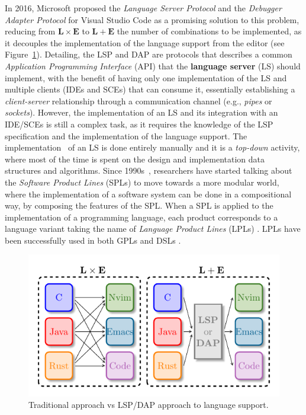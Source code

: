 In 2016, Microsoft proposed the \textit{Language Server Protocol} and the \textit{Debugger Adapter Protocol} for Visual Studio Code as a promising solution to this problem, reducing from $\mathbf{L} \times \mathbf{E}$ to $\mathbf{L} + \mathbf{E}$ the number of combinations to be implemented, as it decouples the implementation of the language support from the editor (see Figure~\ref{fig:traditional}).
Detailing, the LSP and DAP are protocols that describes a common \textit{Application Programming Interface} (API) that the \textbf{language server} (LS) should implement, with the benefit of having only one implementation of the LS and multiple clients (IDEs and SCEs) that can consume it, essentially establishing a \textit{client-server} relationship through a communication channel (e.g., \textit{pipes} or \textit{sockets}).
However, the implementation of an LS and its integration with an IDE/SCEs is still a complex task, as it requires the knowledge of the LSP specification and the implementation of the language support.
The implementation~\cite{Gunasinghe22} of an LS is done entirely manually and it is a \textit{top-down} activity, where most of the time is spent on the design and implementation data structures and algorithms.
Since 1990s~\cite{Kang90}, researchers have started talking about the \textit{Software Product Lines} (SPLs) \cite{Cazzola23d, Cazzola20} to move towards a more modular world, where the implementation of a software system can be done in a compositional way, by composing the features of the SPL.
When a SPL is applied to the implementation of a programming language, each product corresponds to a language variant \cite{Cazzola15f} taking the name of \textit{Language Product Lines} (LPLs) \cite{Cazzola15f}. LPLs have been successfully used in both GPLs \cite{Cazzola16, Cazzola16i, Cazzola15f} and DSLs \cite{Haugen08, Cazzola14e, White09}.

\begin{figure}[t]
    \centering
    \includegraphics[width=0.75\linewidth]{figs/lsp_combinations.pdf}
    \caption{Traditional approach vs LSP/DAP approach to language support.}
    \label{fig:traditional}
\end{figure}

